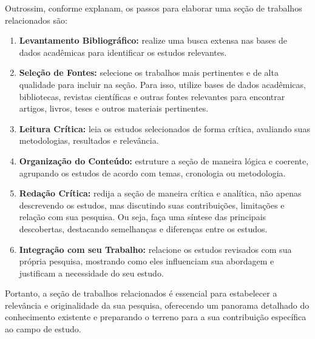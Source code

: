 Outrossim, conforme  explanam, os passos para elaborar uma seção de trabalhos relacionados são:
\begin{enumerate}[label=\roman*., itemsep=0pt, leftmargin=2.5cm]
    \item \textbf{Levantamento Bibliográfico:} realize uma busca extensa nas bases de dados acadêmicas para identificar os estudos relevantes.
    \item \textbf{Seleção de Fontes:} selecione os trabalhos mais pertinentes e de alta qualidade para incluir na seção. Para isso, utilize bases de dados acadêmicas, bibliotecas, revistas científicas e outras fontes relevantes para encontrar artigos, livros, teses e outros materiais pertinentes.
    \item \textbf{Leitura Crítica:} leia os estudos selecionados de forma crítica, avaliando suas metodologias, resultados e relevância.
    \item \textbf{Organização do Conteúdo:} estruture a seção de maneira lógica e coerente, agrupando os estudos de acordo com temas, cronologia ou metodologia.
    \item \textbf{Redação Crítica:} redija a seção de maneira crítica e analítica, não apenas descrevendo os estudos, mas discutindo suas contribuições, limitações e relação com sua pesquisa. Ou seja, faça uma síntese das principais descobertas, destacando semelhanças e diferenças entre os estudos.
    \item \textbf{Integração com seu Trabalho:} relacione os estudos revisados com sua própria pesquisa, mostrando como eles influenciam sua abordagem e justificam a necessidade do seu estudo.
\end{enumerate}

Portanto, a seção de trabalhos relacionados é essencial para estabelecer a relevância e originalidade da sua pesquisa, oferecendo um panorama detalhado do conhecimento existente e preparando o terreno para a sua contribuição específica ao campo de estudo.